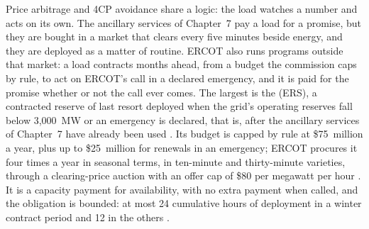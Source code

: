 Price arbitrage and 4CP avoidance share a logic: the load watches a number and acts on its own. The ancillary services of Chapter~7 pay a load for a promise, but they are bought in a market that clears every five minutes beside energy, and they are deployed as a matter of routine. ERCOT also runs programs outside that market: a load contracts months ahead, from a budget the commission caps by rule, to act on ERCOT's call in a declared emergency, and it is paid for the promise whether or not the call ever comes. The largest is the  (ERS), a contracted reserve of last resort deployed when the grid's operating reserves fall below 3,000~MW or an emergency is declared, that is, after the ancillary services of Chapter~7 have already been used \autocite{puct25507,ercot2026protocols}. %
Its budget is capped by rule at \$75~million a year, plus up to \$25~million for renewals in an emergency; ERCOT procures it four times a year in seasonal terms, in ten-minute and thirty-minute varieties, through a clearing-price auction with an offer cap of \$80 per megawatt per hour \autocite{puct25507,ercot2026protocols,ercotattq2025}. %
It is a capacity payment for availability, with no extra payment when called, and the obligation is bounded: at most 24 cumulative hours of deployment in a winter contract period and 12 in the others \autocite{ercot2026protocols}. %
